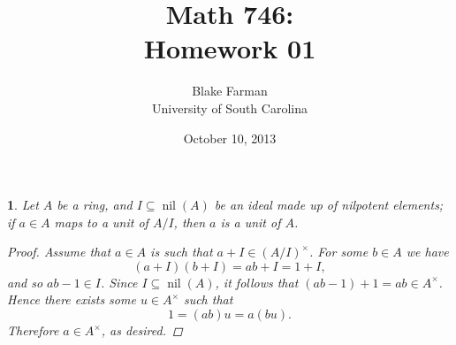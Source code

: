 \documentclass[10pt]{amsart}
\author{Blake Farman\\University of South Carolina}
\title{Math 746:\\Homework 01}
\date{October 10, 2013}
\begin{document}
\maketitle

\providecommand{\p}{\mathfrak{p}}
\providecommand{\m}{\mathfrak{m}}

\newtheorem{thm}{}
\newtheorem{lem}{Lemma}
\newtheorem{prop}{Proposition}
\theoremstyle{definition}
\newtheorem{defn}{Definition}

\newcommand{\A}{\mathbb{A}}
\newcommand{\nil}[1]{\operatorname{nil}{\left(#1\right)}}
\providecommand{\rad}[1]{\operatorname{rad}{\left( #1 \right)}}

\begin{thm}
  Let $A$ be a ring, and $I \subseteq \nil{A}$ be an ideal made up of nilpotent elements; if $a \in A$ maps to a unit of $A / I$, then $a$ is a unit of $A$.

  \begin{proof}
    Assume that $a \in A$ is such that $a + I \in (A/I)^\times$.
    For some $b \in A$ we have
    $$(a + I)(b + I) = ab + I = 1 + I,$$
    and so $ab - 1 \in I$.
    Since $I \subseteq \nil{A}$, it follows that $(ab - 1) + 1 = ab \in A^\times$.
    Hence there exists some $u \in A^\times$ such that
    $$1 = (ab)u = a(bu).$$
    Therefore  $a \in A^\times$, as desired.
  \end{proof}
\end{thm}
\end{document}
